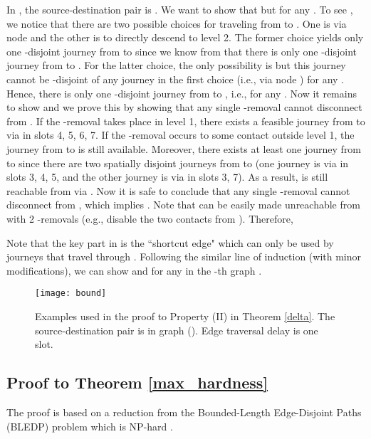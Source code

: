 \documentclass[10pt, conference, letterpaper]{IEEEtran}
\begin{document}
\vspace{1mm}

\noindent  In , the source-destination pair is . We want to show that  but  for any . To see , we notice that there are two possible choices for traveling from  to . One is via node  and the other is to directly descend to level 2. The former choice yields only one -disjoint journey from  to  since we know from  that there is only one -disjoint journey from  to . For the latter choice, the only possibility is  but this journey cannot be -disjoint of any journey in the first choice (i.e., via node ) for any . Hence, there is only one -disjoint journey from  to , i.e.,  for any . Now it remains to show  and we prove this by showing that any single -removal cannot disconnect  from . If the -removal takes place in level 1, there exists a feasible journey from  to  via  in slots 4, 5, 6, 7. If the -removal occurs to some contact outside level 1, the journey from  to  is still available. Moreover, there exists at least one journey from  to  since there are two spatially disjoint journeys from  to  (one journey is via  in slots 3, 4, 5,  and the other journey is via  in slots 3, 7). As a result,  is still reachable from  via . Now it is safe to conclude that any single -removal cannot disconnect  from , which implies . Note that  can be easily made unreachable from  with 2 -removals (e.g., disable the two contacts from ). Therefore, 

\vspace{1mm}

Note that the key part in  is the ``shortcut edge"  which can only be used by journeys that travel through . Following the similar line of induction (with minor modifications), we can show   and  for any  in the -th graph .

\begin{figure}[ht]
\begin{center}
\texttt{[image: bound]}
\caption{Examples used in the proof to Property (II) in Theorem \ref{delta}. The source-destination pair is  in graph  (). Edge traversal delay is one slot.}
\label{bd}\vspace{-5mm}
\end{center}
\end{figure}
\subsection{Proof to Theorem \ref{max_hardness}} \label{proof_max_hardness}
The proof is based on a reduction from the Bounded-Length Edge-Disjoint Paths (BLEDP) problem which is NP-hard \cite{hard}.
\end{document}
